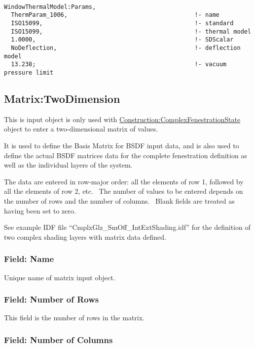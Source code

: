 \begin{lstlisting}

WindowThermalModel:Params,
  ThermParam_1006,                                    !- name
  ISO15099,                                           !- standard
  ISO15099,                                           !- thermal model
  1.0000,                                             !- SDScalar
  NoDeflection,                                       !- deflection model
  13.238;                                             !- vacuum pressure limit
\end{lstlisting}

\subsection{Matrix:TwoDimension}\label{matrixtwodimension}

This is input object is only used with \hyperref[constructioncomplexfenestrationstate]{Construction:ComplexFenestrationState} object to enter a two-dimensional matrix of values.

It is used to define the Basis Matrix for BSDF input data, and is also used to define the actual BSDF matrices data for the complete fenestration definition as well as the individual layers of the system.

The data are entered in row-major order: all the elements of row 1, followed by all the elements of row 2, etc.~ The number of values to be entered depends on the number of rows and the number of columns.~ Blank fields are treated as having been set to zero.

See example IDF file ``CmplxGlz\_{}SmOff\_{}IntExtShading.idf'' for the definition of two complex shading layers with matrix data defined.

\subsubsection{Field: Name}\label{field-name-34-000}

Unique name of matrix input object.

\subsubsection{Field: Number of Rows}\label{field-number-of-rows}

This field is the number of rows in the matrix.

\subsubsection{Field: Number of Columns}\label{field-number-of-columns}

